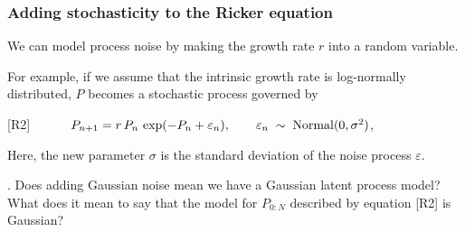 \documentclass{beamer}\usepackage[]{graphicx}\usepackage[]{color}
\newcommand\myeq{\hspace{10mm}}
\newcommand\answer[2]{#1} %
\begin{document}
\begin{frame}[fragile] 

\frametitle{Adding stochasticity to the Ricker equation}

\bi

\item We can model process noise by making the growth rate $r$ into a random variable.

\item For example, if we assume that the intrinsic growth rate is log-normally distributed, $P$ becomes a stochastic process governed by

\ei

\vspace{2mm}

[R2] $\myeq P_{n+1} = r\,P_{n}\,\exp(-P_{n}+\varepsilon_{n}), \qquad \varepsilon_{n}\;\sim\;\mathrm{Normal}(0,\sigma^2)$,

\vspace{1mm}

\bi

\item Here, the new parameter $\sigma$ is the standard deviation of the noise process $\varepsilon$.

\ei

\end{frame}    

\begin{frame}[fragile] 

\myquestion. Does adding Gaussian noise mean we have a Gaussian latent process model? What does it mean to say that the model for $P_{0:N}$ described by equation [R2] is Gaussian?

\answer{\vspace{60mm}}{todo}

\end{frame}    
\end{document}
